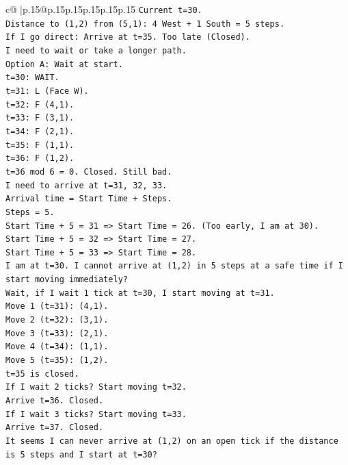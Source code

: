 \documentclass{article}
\begin{document}
{\begin{supertabular}{c@{$\;$}|p{.15\linewidth}@{}p{.15\linewidth}p{.15\linewidth}p{.15\linewidth}p{.15\linewidth}p{.15\linewidth}}
{{{\texttt{Current t=30.} \\
\texttt{Distance to (1,2) from (5,1): 4 West + 1 South = 5 steps.} \\
\texttt{If I go direct: Arrive at t=35. Too late (Closed).} \\
\texttt{I need to wait or take a longer path.} \\
\texttt{Option A: Wait at start.} \\
\texttt{t=30: WAIT.} \\
\texttt{t=31: L (Face W).} \\
\texttt{t=32: F (4,1).} \\
\texttt{t=33: F (3,1).} \\
\texttt{t=34: F (2,1).} \\
\texttt{t=35: F (1,1).} \\
\texttt{t=36: F (1,2).} \\
\texttt{t=36 mod 6 = 0. Closed. Still bad.} \\
\texttt{I need to arrive at t=31, 32, 33.} \\
\texttt{Arrival time = Start Time + Steps.} \\
\texttt{Steps = 5.} \\
\texttt{Start Time + 5 = 31 => Start Time = 26. (Too early, I am at 30).} \\
\texttt{Start Time + 5 = 32 => Start Time = 27.} \\
\texttt{Start Time + 5 = 33 => Start Time = 28.} \\
\texttt{I am at t=30. I cannot arrive at (1,2) in 5 steps at a safe time if I start moving immediately?} \\
\texttt{Wait, if I wait 1 tick at t=30, I start moving at t=31.} \\
\texttt{Move 1 (t=31): (4,1).} \\
\texttt{Move 2 (t=32): (3,1).} \\
\texttt{Move 3 (t=33): (2,1).} \\
\texttt{Move 4 (t=34): (1,1).} \\
\texttt{Move 5 (t=35): (1,2).} \\
\texttt{t=35 is closed.} \\
\texttt{If I wait 2 ticks? Start moving t=32.} \\
\texttt{Arrive t=36. Closed.} \\
\texttt{If I wait 3 ticks? Start moving t=33.} \\
\texttt{Arrive t=37. Closed.} \\
\texttt{It seems I can never arrive at (1,2) on an open tick if the distance is 5 steps and I start at t=30?} \\
}}}
\end{supertabular}}
\end{document}
